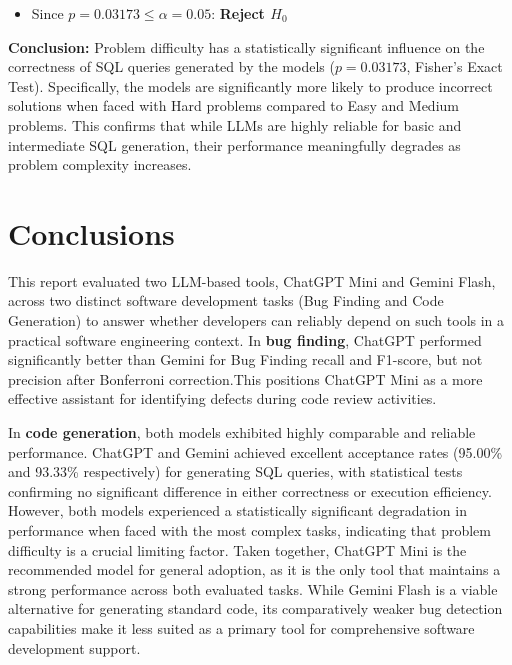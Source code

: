 \documentclass[11pt,a4paper]{article}
\begin{document}
    \begin{itemize}
        \item Since $p = 0.03173 \leq \alpha = 0.05$: \textbf{Reject $H_0$}
    \end{itemize}

    \textbf{Conclusion:} Problem difficulty has a statistically significant influence on the correctness of SQL queries generated by the models ($p = 0.03173$, Fisher's Exact Test). Specifically, the models are significantly more likely to produce incorrect solutions when faced with Hard problems compared to Easy and Medium problems. This confirms that while LLMs are highly reliable for basic and intermediate SQL generation, their performance meaningfully degrades as problem complexity increases.
    \newpage
    \section{Conclusions}
    This report evaluated two LLM-based tools, ChatGPT Mini and Gemini Flash, across two distinct software development tasks (Bug Finding and Code Generation) to answer whether developers can reliably depend on such tools in a practical software engineering context.
    In \textbf{bug finding}, ChatGPT performed significantly better than Gemini for Bug Finding recall and F1-score, but not precision after Bonferroni correction.This positions ChatGPT Mini as a more effective assistant for identifying defects during code review activities.
    
    In \textbf{code generation}, both models exhibited highly comparable and reliable performance. ChatGPT and Gemini achieved excellent acceptance rates (95.00\% and 93.33\% respectively) for generating SQL queries, with statistical tests confirming no significant difference in either correctness or execution efficiency. However, both models experienced a statistically significant degradation in performance when faced with the most complex tasks, indicating that problem difficulty is a crucial limiting factor.
    Taken together, ChatGPT Mini is the recommended model for general adoption, as it is the only tool that maintains a strong performance across both evaluated tasks. While Gemini Flash is a viable alternative for generating standard code, its comparatively weaker bug detection capabilities make it less suited as a primary tool for comprehensive software development support.
    
    
    
    
    {}
    
\end{document}

